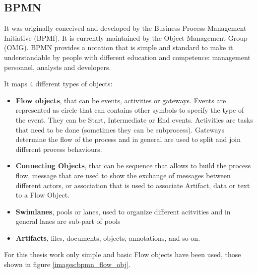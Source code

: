 \subsection{BPMN}
It was originally conceived and developed by the Business Process Management Initiative (BPMI). It is currently 
maintained by the Object Management Group (OMG). BPMN provides a notation that is simple and standard to make it 
understandable by people with different education and competence: management personnel, analysts and developers.

It maps 4 different types of objects: 

\begin{itemize}
    \item \textbf{Flow objects}, that can be events, activities or gateways. Events are represented as circle that can 
        contains other symbols to specify the type of the event. They can be Start, Intermediate or End events. Activities 
        are tasks that need to be done (sometimes they can be subprocess). Gateways determine the flow of the process and 
        in general are used to split and join different process behaviours.
    \item \textbf{Connecting Objects}, that can be sequence that allows to build the process flow, message that are used to 
        show the exchange of messages between different actors, or association that is used to associate Artifact, data or 
        text to a Flow Object. 
    \item \textbf{Swimlanes}, pools or lanes, used to organize different acitvities and in general lanes are sub-part of pools
    \item \textbf{Artifacts}, files, documents, objects, annotations, and so on.
\end{itemize}

For this thesis work only simple and basic Flow objects have been used, those shown in figure \ref{images:bpmn_flow_obj}.

